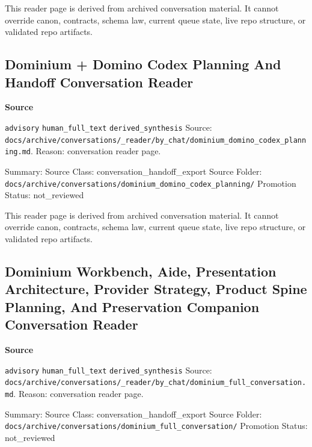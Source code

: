 \documentclass[9pt,a4paper,openany]{book}
\newcommand{\vonecallout}[3]{\par\medskip\noindent\begingroup\setlength{\fboxsep}{7pt}\colorbox{DomCalloutBg}{\parbox{0.94\linewidth}{\textbf{\textcolor{#1}{#2}}\par #3}}\endgroup\par\medskip}
\begin{document}
This reader page is derived from archived conversation material.\allowbreak{} It cannot override canon, contracts, schema law, current queue state, live repo structure, or validated repo artifacts.\allowbreak{}



\subsection{Dominium + Domino Codex Planning And Handoff Conversation Reader}

\vonecallout{DomSlate}{Source}{\texttt{advisory} \texttt{human\_\allowbreak{}full\_\allowbreak{}text} \texttt{derived\_\allowbreak{}synthesis} Source: \texttt{docs/\allowbreak{}archive/\allowbreak{}conversations/\allowbreak{}\_\allowbreak{}reader/\allowbreak{}by\_\allowbreak{}chat/\allowbreak{}dominium\_\allowbreak{}domino\_\allowbreak{}codex\_\allowbreak{}planning.\allowbreak{}md}.\allowbreak{} Reason: conversation reader page.\allowbreak{}}

Summary: Source Class: conversation\_\allowbreak{}handoff\_\allowbreak{}export Source Folder: \texttt{docs/\allowbreak{}archive/\allowbreak{}conversations/\allowbreak{}dominium\_\allowbreak{}domino\_\allowbreak{}codex\_\allowbreak{}planning/\allowbreak{}} Promotion Status: not\_\allowbreak{}reviewed


This reader page is derived from archived conversation material.\allowbreak{} It cannot override canon, contracts, schema law, current queue state, live repo structure, or validated repo artifacts.\allowbreak{}



\subsection{Dominium Workbench, Aide, Presentation Architecture, Provider Strategy, Product Spine Planning, And Preservation Companion Conversation Reader}

\vonecallout{DomSlate}{Source}{\texttt{advisory} \texttt{human\_\allowbreak{}full\_\allowbreak{}text} \texttt{derived\_\allowbreak{}synthesis} Source: \texttt{docs/\allowbreak{}archive/\allowbreak{}conversations/\allowbreak{}\_\allowbreak{}reader/\allowbreak{}by\_\allowbreak{}chat/\allowbreak{}dominium\_\allowbreak{}full\_\allowbreak{}conversation.\allowbreak{}md}.\allowbreak{} Reason: conversation reader page.\allowbreak{}}

Summary: Source Class: conversation\_\allowbreak{}handoff\_\allowbreak{}export Source Folder: \texttt{docs/\allowbreak{}archive/\allowbreak{}conversations/\allowbreak{}dominium\_\allowbreak{}full\_\allowbreak{}conversation/\allowbreak{}} Promotion Status: not\_\allowbreak{}reviewed
\end{document}
